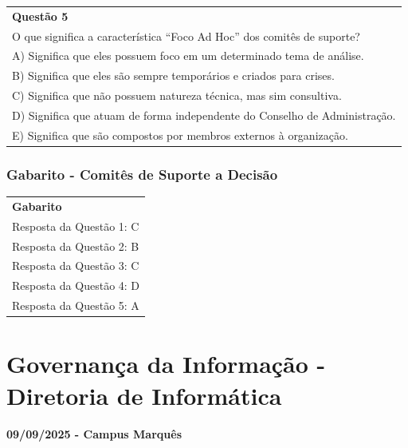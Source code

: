\documentclass[
]{book}
\begin{document}
\begin{longtable}[]{@{}
  >{\raggedright\arraybackslash}p{}@{}}
\toprule\noalign{}
\endhead
\bottomrule\noalign{}
\endlastfoot
\textbf{Questão 5} \\
O que significa a característica ``Foco Ad Hoc'' dos comitês de suporte? \\
A) Significa que eles possuem foco em um determinado tema de análise. \\
B) Significa que eles são sempre temporários e criados para crises. \\
C) Significa que não possuem natureza técnica, mas sim consultiva. \\
D) Significa que atuam de forma independente do Conselho de Administração. \\
E) Significa que são compostos por membros externos à organização. \\
\end{longtable}

\subsection{Gabarito - Comitês de Suporte a Decisão}\label{gabarito---comituxeas-de-suporte-a-decisuxe3o}

\begin{longtable}[]{@{}l@{}}
\toprule\noalign{}
\endhead
\bottomrule\noalign{}
\endlastfoot
\textbf{Gabarito} \\
Resposta da Questão 1: C \\
Resposta da Questão 2: B \\
Resposta da Questão 3: C \\
Resposta da Questão 4: D \\
Resposta da Questão 5: A \\
\end{longtable}

\chapter{Governança da Informação - Diretoria de Informática}\label{governanuxe7a-da-informauxe7uxe3o---diretoria-de-informuxe1tica}

\subsubsection*{09/09/2025 - Campus Marquês}\label{campus-marquuxeas-5}
\end{document}
